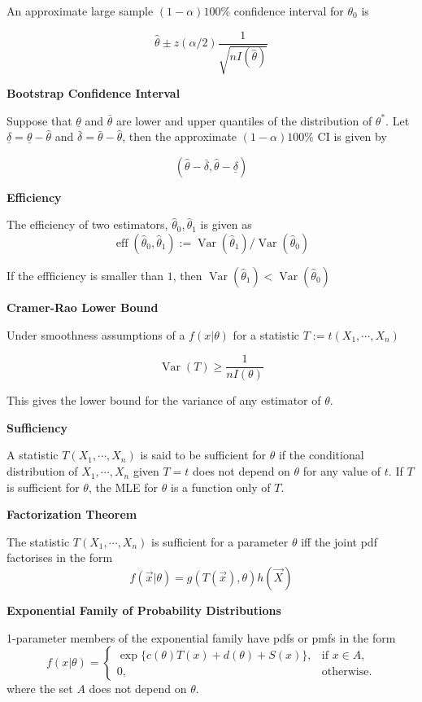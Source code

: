 \documentclass[a4paper]{article}
\newcommand{\subheading}[1]{{\scriptsize\textbf{#1}}}
\DeclareMathOperator{\Var}{Var}
\DeclareMathOperator{\eff}{eff}
\begin{document}
\begin{multicols*}{4}
An approximate large sample $(1-\alpha)100\%$ confidence interval for $\theta_0$ is

$$
\hat{\theta} \pm z(\alpha/2)\frac{1}{\sqrt{nI(\hat{\theta})}}
$$

\subheading{Bootstrap Confidence Interval}

Suppose that $\underline\theta$ and $\bar\theta$ are lower and upper quantiles of the distribution of $\theta^*$. Let $\underline\delta = \underline\theta - \hat\theta$ and $\bar\delta = \bar\theta - \hat\theta$, then the approximate $(1-\alpha)100\%$ CI is given by

$$(\hat\theta-\bar\delta,\hat\theta -\underline\delta)$$

\subheading{Efficiency}

  The efficiency of two estimators, $\hat{\theta}_0, \hat{\theta}_1$ is given as
  $$\eff(\hat{\theta}_0, \hat{\theta}_1) :=
    \Var(\hat{\theta}_1)/\Var(\hat{\theta}_0)$$
  
  If the effficiency is smaller than $1$, then $\Var(\hat{\theta}_1)< \Var(\hat{\theta}_0)$

\subheading{Cramer-Rao Lower Bound}

  Under smoothness assumptions of a $f(x|\theta)$ for a statistic $T:=t(X_1,
  \cdots, X_n)$
  
  $$\Var(T) \geq \frac{1}{nI(\theta)}$$
  
  This gives the lower bound for the variance of any estimator of $\theta$. \smallskip

\subheading{Sufficiency}

A statistic $T(X_1, \cdots, X_n)$ is said to be sufficient for $\theta$ if the
  conditional distribution of $X_1, \cdots, X_n$ given $T=t$ does not depend on
  $\theta$ for any value of $t$. If $T$ is sufficient for $\theta$, the MLE for
  $\theta$ is a function only of $T$.
  \smallskip

\subheading{Factorization Theorem}

  The statistic $T(X_1, \cdots, X_n)$ is sufficient for a parameter $\theta$ iff
  the joint pdf factorises in the form
  $$f(\vec{x}|\theta) = g(T(\vec{x}), \theta)h(\vec{X})$$

\subheading{Exponential Family  of Probability Distributions}

1-parameter members of the exponential family have pdfs or pmfs in the form
  $$f(x|\theta) = \begin{cases}
      \exp\{c(\theta)T(x)+d(\theta)+S(x)\}, & \text{if } x \in A, \\
      0, & \text{otherwise.}
  \end{cases}$$
  where the set $A$ does not depend on $\theta$.


\end{multicols*}
\end{document}
